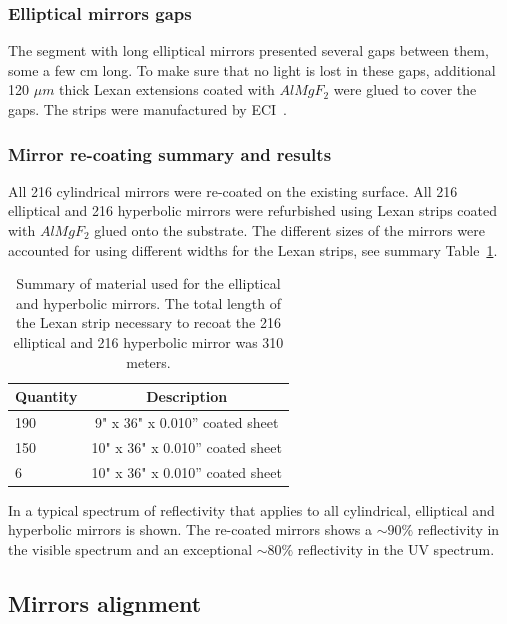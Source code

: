 \subsubsection{Elliptical mirrors gaps}

The segment with long elliptical mirrors presented several gaps between them, some a few cm long. To make sure that no light is lost in these gaps,
additional 120 $\mu m$ thick Lexan extensions coated with $AlMgF_2$ were glued to cover the gaps. The strips were manufactured by ECI~\cite{ECI}.


\subsubsection{Mirror re-coating summary and results}

All 216 cylindrical mirrors were re-coated on the existing surface. All 216 elliptical and 216 hyperbolic mirrors were refurbished using Lexan strips
coated with $AlMgF_2$ glued onto the substrate. The different sizes of the mirrors were accounted for using different widths for the Lexan strips, see
summary Table~\ref{tab:strips}.


\begin{table}[h]
	\begin{center}
		\begin{tabular}{| l | c |}
			\hline \hline
			Quantity  & Description \\
			\hline
			190       & 9" x 36" x 0.010” coated sheet    \\
			150       & 10" x 36" x 0.010” coated sheet   \\
			6         & 10" x 36" x 0.010” coated sheet   \\
			\hline \hline
		\end{tabular}
	\end{center}
	\caption{Summary of material used for the elliptical and hyperbolic mirrors. The total length of the Lexan strip necessary to recoat the 216 elliptical
            and 216 hyperbolic mirror was 310 meters.}\label{tab:strips}
\end{table}


In  a typical spectrum of reflectivity that applies to all cylindrical, elliptical and hyperbolic mirrors is shown.
The re-coated mirrors shows a $\sim 90\%$ reflectivity in the visible spectrum and an exceptional $\sim 80\%$
reflectivity in the UV spectrum.



\subsection{Mirrors alignment}

